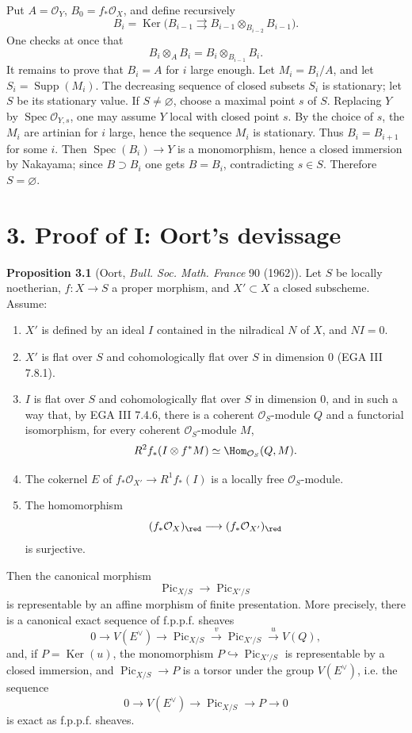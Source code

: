 \documentclass[11pt]{article}
\newcommand{\Spec}{\operatorname{Spec}}
\providecommand{\Pic}{\operatorname{Pic}}
\providecommand{\Ker}{\operatorname{Ker}}
\providecommand{\Supp}{\operatorname{Supp}}
\begin{document}
Put \(A=\mathcal O_Y\), \(B_0=f_*\mathcal O_X\), and define recursively
\[
  B_i=\Ker\bigl(B_{i-1}\rightrightarrows B_{i-1}\otimes_{B_{i-2}}B_{i-1}\bigr).
\]
One checks at once that
\[
  B_i\otimes_A B_i=B_i\otimes_{B_{i-1}}B_i.
\]
It remains to prove that \(B_i=A\) for \(i\) large enough. Let \(M_i=B_i/A\), and let \(S_i=\Supp(M_i)\). The decreasing sequence of closed subsets \(S_i\) is stationary; let \(S\) be its stationary value. If \(S\neq\varnothing\), choose a maximal point \(s\) of \(S\). Replacing \(Y\) by \(\Spec\mathcal O_{Y,s}\), one may assume \(Y\) local with closed point \(s\). By the choice of \(s\), the \(M_i\) are artinian for \(i\) large, hence the sequence \(M_i\) is stationary. Thus \(B_i=B_{i+1}\) for some \(i\). Then \(\Spec(B_i)\to Y\) is a monomorphism, hence a closed immersion by Nakayama; since \(B\supset B_i\) one gets \(B=B_i\), contradicting \(s\in S\). Therefore \(S=\varnothing\).

\section*{3. Proof of I: Oort's devissage}

\textbf{Proposition 3.1} (Oort, \emph{Bull. Soc. Math. France} 90 (1962)). Let \(S\) be locally noetherian, \(f:X\to S\) a proper morphism, and \(X'\subset X\) a closed subscheme. Assume:
\begin{enumerate}[label=\roman*)]
\item \(X'\) is defined by an ideal \(I\) contained in the nilradical \(N\) of \(X\), and \(NI=0\).
\item \(X'\) is flat over \(S\) and cohomologically flat over \(S\) in dimension \(0\) (EGA III 7.8.1).
\item \(I\) is flat over \(S\) and cohomologically flat over \(S\) in dimension \(0\), and in such a way that, by EGA III 7.4.6, there is a coherent \(\mathcal O_S\)-module \(Q\) and a functorial isomorphism, for every coherent \(\mathcal O_S\)-module \(M\),
\[
  R^2 f_*(I\otimes f^*M)\simeq \Hom_{\mathcal O_S}(Q,M).
\]
\item The cokernel \(E\) of \(f_*\mathcal O_{X'}\to R^1f_*(I)\) is a locally free \(\mathcal O_S\)-module.
\item The homomorphism
\[
  (f_*\mathcal O_X)_{\red}\longrightarrow (f_*\mathcal O_{X'})_{\red}
\]
is surjective.
\end{enumerate}
Then the canonical morphism
\[
  \Pic_{X/S}\longrightarrow \Pic_{X'/S}
\]
is representable by an affine morphism of finite presentation. More precisely, there is a canonical exact sequence of f.p.p.f. sheaves
\[
  0\longrightarrow V(E^\vee)\longrightarrow \Pic_{X/S}
  \xrightarrow{v}\Pic_{X'/S}\xrightarrow{u} V(Q),
\]
and, if \(P=\Ker(u)\), the monomorphism \(P\hookrightarrow\Pic_{X'/S}\) is representable by a closed immersion, and \(\Pic_{X/S}\to P\) is a torsor under the group \(V(E^\vee)\), i.e. the sequence
\[
  0\longrightarrow V(E^\vee)\longrightarrow \Pic_{X/S}\longrightarrow P\longrightarrow 0
\]
is exact as f.p.p.f. sheaves.
\end{document}
